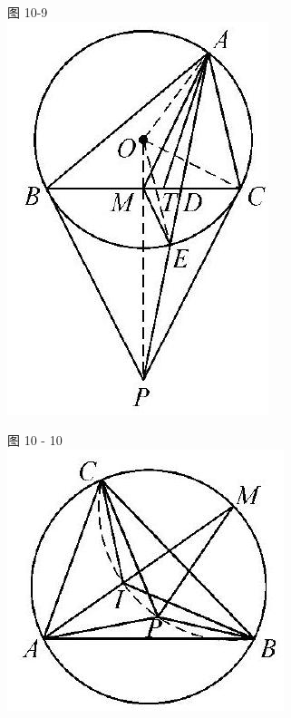 \documentclass[10pt]{article}
\begin{document}
图 10-9\\
\includegraphics[max width=\textwidth, center]{2024_10_30_66b8e5e701da2093c133g-076(2)}

图 10 - 10\\
\includegraphics[max width=\textwidth, center]{2024_10_30_66b8e5e701da2093c133g-076(1)}
\end{document}
